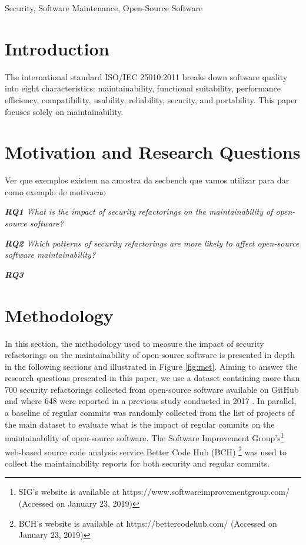 \documentclass[10pt,conference]{IEEEtran}
\begin{document}
\begin{IEEEkeywords}
Security, Software Maintenance, Open-Source Software
\end{IEEEkeywords}

\section{Introduction}



The international standard ISO/IEC 25010:2011 breaks down software quality into eight characteristics: maintainability,
functional suitability, performance efficiency, compatibility, usability, reliability, security,
and portability. This paper focuses solely on maintainability.



\section{Motivation and Research Questions}

\textcolor{mypink3}{Ver que exemplos existem na amostra da secbench que vamos utilizar para dar como exemplo de motivacao}

\begin{framed}
\textit{\textbf{RQ1} What is the impact of security refactorings on the maintainability of open-source software?}
\end{framed}

\begin{framed}
\textit{\textbf{RQ2} Which patterns of security refactorings are more likely to affect open-source software maintainability?}
\end{framed}

\begin{framed}
\textit{\textbf{RQ3} }
\end{framed}


\section{Methodology}

In this section, the methodology used to measure the impact of security refactorings on the maintainability of open-source software is presented in depth in the following sections and illustrated in Figure \ref{fig:met}. Aiming to answer the research questions presented in this paper, we use a dataset containing more than 700 security refactorings collected from open-source software available on GitHub and where 648 were reported in a previous study conducted in 2017 \cite{Reis:2017:IJSSE}. In parallel, a baseline of regular commits was randomly collected from the list of projects of the main dataset to evaluate what is the impact of regular commits on the maintainability of open-source software. The Software Improvement Group's\footnote{SIG's website is available at https://www.softwareimprovementgroup.com/ (Accessed on January 23, 2019)} web-based source code analysis service Better Code Hub (BCH) \footnote{BCH's website is available at https://bettercodehub.com/ (Accessed on January 23, 2019)} was used to collect the maintainability reports for both security and regular commits.
\end{document}
